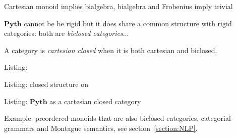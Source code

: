 
Cartesian monoid implies bialgebra, bialgebra and Frobenius imply trivial

$\mathbf{Pyth}$ cannot be be rigid but it does share a common structure with rigid categories: both are \emph{biclosed categories}...

A category is \emph{cartesian closed} when it is both cartesian and biclosed.

Listing: 

Listing: closed structure on 

Listing: $\mathbf{Pyth}$ as a cartesian closed category

Example: preordered monoids that are also biclosed categories, categorial grammars and Montague semantics, see section~\ref{section:NLP}.
